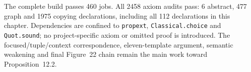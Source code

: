






The complete build passes 460 jobs. All 2458 axiom audits pass: 6 abstract,
477 graph and 1975 copying declarations, including all 112 declarations in
this chapter. Dependencies are confined to \texttt{propext},
\texttt{Classical.choice} and \texttt{Quot.sound}; no project-specific axiom
or omitted proof is introduced. The focused/tuple/context correspondence,
eleven-template argument, semantic weakening and final Figure~22 chain remain
the main work toward Proposition~12.2.

